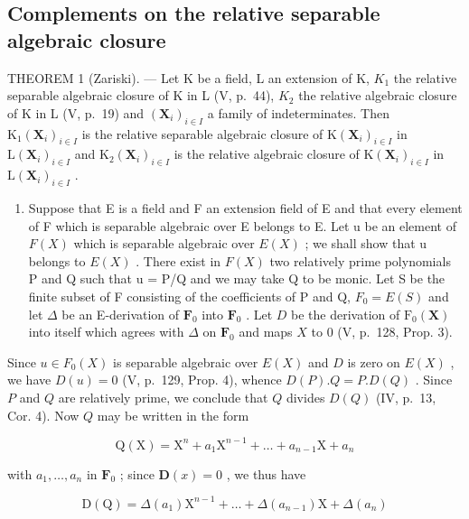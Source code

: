 \subsection{Complements on the relative separable algebraic closure}

THEOREM 1 (Zariski). --- Let K be a field, L an extension of K, \(K_{1}\) the relative separable algebraic closure of K in L (V, p.~44), \(K_{2}\) the relative algebraic closure of K in L (V, p.~19) and \((\mathbf{X}_{i})_{i\in I}\) a family of indeterminates. Then \(\mathrm{K}_{1}(\mathbf{X}_{i})_{i\in I}\) is the relative separable algebraic closure of \(\mathrm{K}(\mathbf{X}_{i})_{i\in I}\) in \(\mathrm{L}(\mathbf{X}_{i})_{i\in I}\) and \(\mathrm{K}_{2}(\mathbf{X}_{i})_{i\in I}\) is the relative algebraic closure of \(\mathrm{K}(\mathbf{X}_{i})_{i\in I}\) in \(\mathrm{L}(\mathbf{X}_{i})_{i\in I}\) .

\begin{enumerate}
\def\labelenumi{\Alph{enumi})}
\tightlist
\item
  Suppose that E is a field and F an extension field of E and that every element of F which is separable algebraic over E belongs to E. Let u be an element of \(F(X)\) which is separable algebraic over \(E(X)\) ; we shall show that u belongs to \(E(X)\) . There exist in \(F(X)\) two relatively prime polynomials P and Q such that u = P/Q and we may take Q to be monic. Let S be the finite subset of F consisting of the coefficients of P and Q, \(F_{0} = E(S)\) and let \(\Delta\) be an E-derivation of \(\mathbf{F}_0\) into \(\mathbf{F}_0\) . Let \(D\) be the derivation of \(\mathrm{F}_0(\mathbf{X})\) into itself which agrees with \(\Delta\) on \(\mathbf{F}_0\) and maps \(X\) to 0 (V, p.~128, Prop. 3).
\end{enumerate}

Since \(u \in F_0(X)\) is separable algebraic over \(E(X)\) and \(D\) is zero on \(E(X)\) , we have \(D(u) = 0\) (V, p.~129, Prop. 4), whence \(D(P).Q = P.D(Q)\) . Since \(P\) and \(Q\) are relatively prime, we conclude that \(Q\) divides \(D(Q)\) (IV, p.~13, Cor. 4). Now \(Q\) may be written in the form

\[
\mathrm{Q} (\mathrm{X}) = \mathrm{X} ^ {n} + a _ {1} \mathrm{X} ^ {n - 1} + \dots + a _ {n - 1} \mathrm{X} + a _ {n}
\]

with \(a_1, \ldots, a_n\) in \(\mathbf{F}_0\) ; since \(\mathbf{D}(x) = 0\) , we thus have

\[
\mathrm{D} (\mathrm{Q}) = \Delta (a _ {1}) \mathrm{X} ^ {n - 1} + \dots + \Delta (a _ {n - 1}) \mathrm{X} + \Delta (a _ {n})\tag{1}
\]

